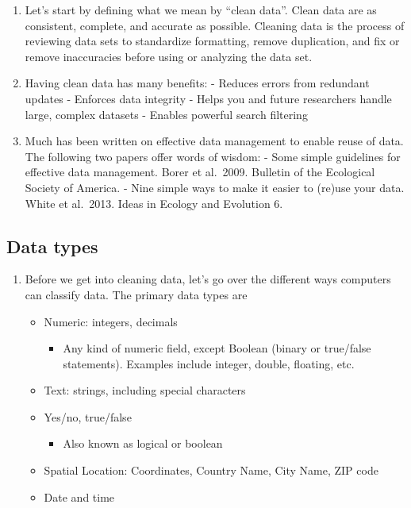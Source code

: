 \documentclass[
]{book}
\providecommand{\tightlist}{%
  \setlength{\itemsep}{0pt}\setlength{\parskip}{0pt}}
\begin{document}
\begin{enumerate}
\def\labelenumi{\arabic{enumi}.}
\item
  Let's start by defining what we mean by ``clean data''. Clean data are as consistent, complete, and accurate as possible. Cleaning data is the process of reviewing data sets to standardize formatting, remove duplication, and fix or remove inaccuracies before using or analyzing the data set.
\item
  Having clean data has many benefits:
  - Reduces errors from redundant updates
  - Enforces data integrity
  - Helps you and future researchers handle large, complex datasets
  - Enables powerful search filtering
\item
  Much has been written on effective data management to enable reuse of data. The following two papers offer words of wisdom:
  - Some simple guidelines for effective data management. Borer et al.~2009. Bulletin of the Ecological Society of America.
  - Nine simple ways to make it easier to (re)use your data. White et al.~2013. Ideas in Ecology and Evolution 6.
\end{enumerate}

\hypertarget{data-types}{%
\subsection{Data types}\label{data-types}}

\begin{enumerate}
\def\labelenumi{\arabic{enumi}.}
\item
  Before we get into cleaning data, let's go over the different ways computers can classify data. The primary data types are

  \begin{itemize}
  \item
    Numeric: integers, decimals

    \begin{itemize}
    \tightlist
    \item
      Any kind of numeric field, except Boolean (binary or true/false statements). Examples include integer, double, floating, etc.
    \end{itemize}
  \item
    Text: strings, including special characters
  \item
    Yes/no, true/false

    \begin{itemize}
    \tightlist
    \item
      Also known as logical or boolean
    \end{itemize}
  \item
    Spatial Location: Coordinates, Country Name, City Name, ZIP code
  \item
    Date and time
  \end{itemize}
\end{enumerate}
\end{document}
